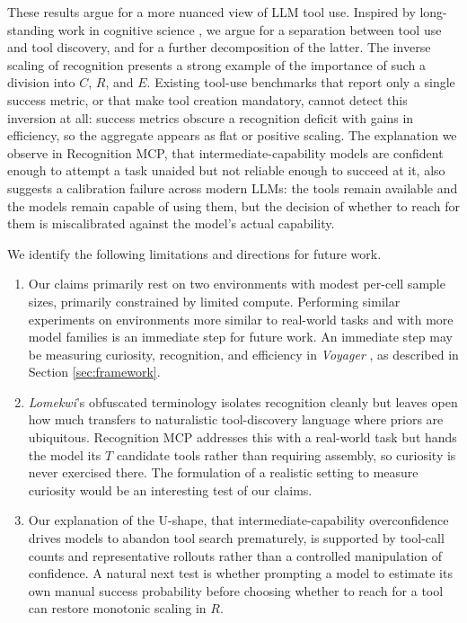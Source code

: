 \documentclass{article}
\begin{document}
These results argue for a more nuanced view of LLM tool use. Inspired by long-standing work in cognitive science \citep{neldner2020crosscultural,kohler1925mentality,osiurak2016tool,bird2009rooks}, we argue for a separation between tool use and tool discovery, and for a further decomposition of the latter. The inverse scaling of recognition presents a strong example of the importance of such a division into $C$, $R$, and $E$. Existing tool-use benchmarks that report only a single success metric, or that make tool creation mandatory, cannot detect this inversion at all: success metrics obscure a recognition deficit with gains in efficiency, so the aggregate appears as flat or positive scaling. The explanation we observe in Recognition MCP, that intermediate-capability models are confident enough to attempt a task unaided but not reliable enough to succeed at it, also suggests a calibration failure across modern LLMs: the tools remain available and the models remain capable of using them, but the decision of whether to reach for them is miscalibrated against the model's actual capability.

We identify the following limitations and directions for future work.

\begin{enumerate}
    \item Our claims primarily rest on two environments with modest per-cell sample sizes, primarily constrained by limited compute. Performing similar experiments on environments more similar to real-world tasks and with more model families is an immediate step for future work. An immediate step may be measuring curiosity, recognition, and efficiency in \textit{Voyager} \citep{wang2024voyager}, as described in Section \ref{sec:framework}.
    \item \emph{Lomekwi}'s obfuscated terminology isolates recognition cleanly but leaves open how much transfers to naturalistic tool-discovery language where priors are ubiquitous. Recognition MCP addresses this with a real-world task but hands the model its $T$ candidate tools rather than requiring assembly, so curiosity is never exercised there. The formulation of a realistic setting to measure curiosity would be an interesting test of our claims.
    \item Our explanation of the U-shape, that intermediate-capability overconfidence drives models to abandon tool search prematurely, is supported by tool-call counts and representative rollouts rather than a controlled manipulation of confidence. A natural next test is whether prompting a model to estimate its own manual success probability before choosing whether to reach for a tool can restore monotonic scaling in $R$.
\end{enumerate}   
\end{document}
